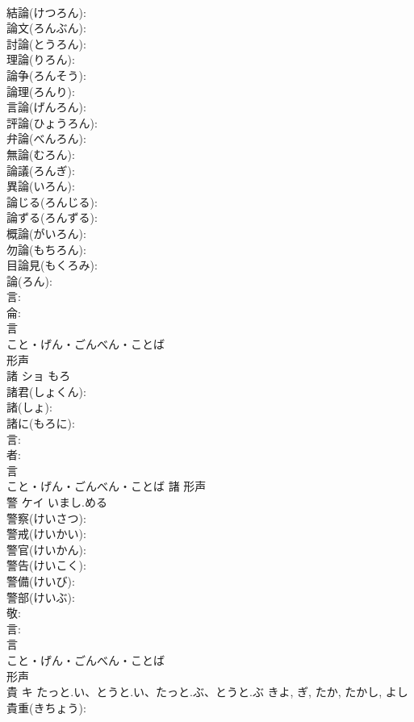 \documentclass[8pt]{extreport}
\begin{document}
\begin{CJK}{UTF8}{min}
\\	結論(けつろん): 
\\	論文(ろんぶん): 
\\	討論(とうろん): 
\\	理論(りろん): 
\\	論争(ろんそう): 
\\	論理(ろんり): 
\\	言論(げんろん): 
\\	評論(ひょうろん): 
\\	弁論(べんろん): 
\\	無論(むろん): 
\\	論議(ろんぎ): 
\\	異論(いろん): 
\\	論じる(ろんじる): 
\\	論ずる(ろんずる): 
\\	概論(がいろん): 
\\	勿論(もちろん): 
\\	目論見(もくろみ): 
\\	論(ろん): 
\\	言: 
\\	侖: 
\\	言	
\\	こと・げん・ごんべん・ことば	
\\	形声 
\\	諸	ショ	もろ		
\\	諸君(しょくん): 
\\	諸(しょ): 
\\	諸に(もろに): 
\\	言: 
\\	者: 
\\	言	
\\	こと・げん・ごんべん・ことば	諸	形声 
\\	警	ケイ	いまし.める		
\\	警察(けいさつ): 
\\	警戒(けいかい): 
\\	警官(けいかん): 
\\	警告(けいこく): 
\\	警備(けいび): 
\\	警部(けいぶ): 
\\	敬: 
\\	言: 
\\	言	
\\	こと・げん・ごんべん・ことば	
\\	形声 
\\	貴	キ	たっと.い、とうと.い、たっと.ぶ、とうと.ぶ	きよ, ぎ, たか, たかし, よし	
\\	貴重(きちょう): 

\end{CJK}
\end{document}
